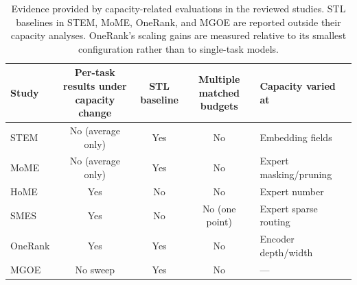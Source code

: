 \begin{table}[!t]
\centering
\small
\caption{Evidence provided by capacity-related evaluations in the reviewed studies.
STL baselines in STEM, MoME, OneRank, and MGOE are reported outside their capacity
analyses. OneRank's scaling gains are measured relative to its smallest configuration
rather than to single-task models.}
\label{tab:evaluation_evidence}

\begin{tabular}{lcccl}
\toprule
\textbf{Study}
& \makecell{\textbf{Per-task results under}\\\textbf{capacity change}}
& \makecell{\textbf{STL}\\\textbf{baseline}}
& \makecell{\textbf{Multiple matched}\\\textbf{budgets}}
& \textbf{Capacity varied at} \\
\midrule

STEM \citep{Su2024STEM}
& No (average only)
& Yes
& No
& Embedding fields \\

MoME \citep{Xu2024MoME}
& No (average only)
& Yes
& No
& Expert masking/pruning \\

HoME \citep{wang2025home}
& Yes
& No
& No
& Expert number \\

SMES \citep{Zhang2026SMES}
& Yes
& No
& No (one point)
& Expert sparse routing \\

OneRank \citep{Tang2026OneRank}
& Yes
& Yes
& No
& Encoder depth/width \\

MGOE \citep{Yao2026MGOE}
& No sweep
& Yes
& No
& --- \\

\bottomrule
\end{tabular}
\end{table}



